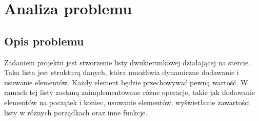 \newpage
\section{Analiza problemu}		%
\subsection{Opis problemu}
Zadaniem projektu jest stworzenie listy dwukierunkowej działającej na stercie. Taka lista jest strukturą danych, która umożliwia dynamiczne dodawanie i usuwanie elementów. Każdy element będzie przechowywać pewną wartość. W ramach tej listy zostaną zaimplementowane różne operacje, takie jak dodawanie elementów na początek i koniec, usuwanie elementów, wyświetlanie zawartości listy w różnych porządkach oraz inne funkcje.



